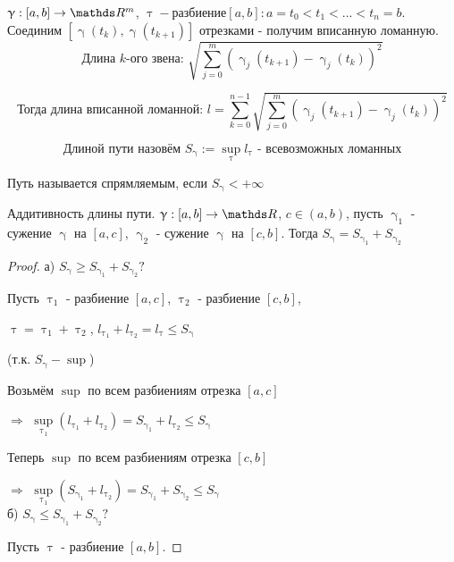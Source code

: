 \documentclass[11pt, fleqn]{article}
\begin{document}
\begin{Property}[3]
\begin{Property}[4]
\begin{Property}[2, аддитивность]
\begin{Proof}
\begin{definition} 
	$\upgamma: [a,b] \rightarrow \R^m$, $\uptau - разбиение [a,b]: a=t_0<t_1<...<t_n=b$. Соединим $[\upgamma(t_k), \upgamma(t_{k+1})]$ отрезками - получим вписанную ломанную. 
    $$\text{Длина $k$-ого звена: }\sqrt{\sum\limits_{j=0}^m (\upgamma_j(t_{k+1}) - \upgamma_j(t_k))^2}$$ 
    
    $$\text{Тогда длина вписанной ломанной: }l=\sum\limits_{k=0}^{n-1} \sqrt{\sum\limits_{j=0}^m (\upgamma_j(t_{k+1}) - \upgamma_j(t_k))^2}$$
    
    $$\text{Длиной пути назовём } S_\upgamma := \sup\limits_{\uptau} l_\uptau\text{ - всевозможных ломанных}$$
\end{definition}

\begin{definition}
    Путь называется спрямляемым, если $S_\upgamma < +\infty$
\end{definition}

\begin{utv}
    Аддитивность длины пути. $\upgamma: [a,b] \rightarrow \R$, $c \in (a,b)$, пусть $\upgamma_1$ - сужение $\upgamma$ на $[a,c]$, $\upgamma_2$ - сужение $\upgamma$ на $[c,b]$. Тогда $S_\upgamma = S_{\upgamma_1} + S_{\upgamma_2}$
\end{utv}

\begin{proof}
    а) $S_\upgamma \geqslant S_{\upgamma_1} + S_{\upgamma_2} ?$
    
    Пусть $\uptau_1$ - разбиение $[a,c]$, $\uptau_2$ - разбиение $[c,b]$, 
    
    $\uptau = \uptau_1 + \uptau_2$, $l_{\uptau_1} + l_{\uptau_2} = l_\uptau \leqslant S_\upgamma$ 
    
    (т.к. $S_\upgamma - \sup$)
    
    Возьмём $\sup$ по всем разбиениям отрезка $[a,c]$ 
    
    $\Rightarrow$ $\sup\limits_{\uptau_1} (l_{\uptau_1} + l_{\uptau_2}) = S_{\upgamma_1} + l_{\uptau_2} \leqslant S_\upgamma$
    
    Теперь $\sup$ по всем разбиениям отрезка $[c,b]$ 
    
    $\Rightarrow$ $\sup\limits_{\uptau_1} (S_{\upgamma_1} + l_{\uptau_2}) = S_{\upgamma_1} + S_{\upgamma_2} \leqslant S_\upgamma$
    \\
    б) $S_\upgamma \leqslant S_{\upgamma_1} + S_{\upgamma_2} ?$
    
    Пусть $\uptau$ - разбиение $[a,b]$. 
    

\end{proof}
\end{Proof}
\end{Property}
\end{Property}
\end{Property}
\end{document}
